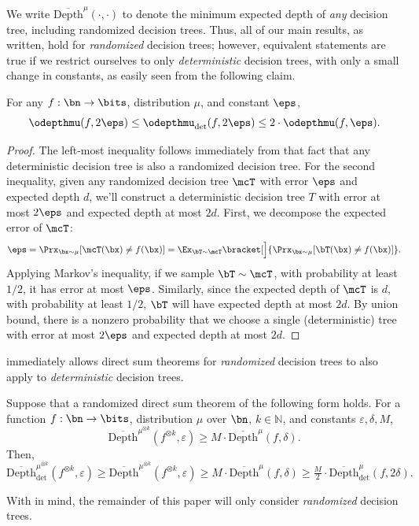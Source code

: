 We write $\overline{\mathrm{Depth}}^{\mu}(\cdot,\cdot)$ to denote the minimum expected depth of \emph{any} decision tree, including randomized decision trees. Thus, all of our main results, as written, hold for \emph{randomized} decision trees; however, equivalent statements are true if we restrict ourselves to only \emph{deterministic} decision trees, with only a small change in constants, as easily seen from the following claim.
\begin{claim}
    \label{claim:connect-det-rand}
    For any $f:\bn \to \bits$, distribution $\mu$, and constant $\eps$,
    \begin{equation*}
         \odepthmu(f,2\eps) \leq \odepthmu_{\det}(f, 2\eps) \leq 2 \cdot \odepthmu(f, \eps).
    \end{equation*}
\end{claim}
\begin{proof}
    The left-most inequality follows immediately from that fact that any deterministic decision tree is also a randomized decision tree. For the second inequality, given any randomized decision tree $\mcT$ with error $\eps$ and expected depth $d$, we'll construct a deterministic decision tree $T$ with error at most $2\eps$ and expected depth at most $2d$. First, we decompose the expected error of $\mcT$:
    \begin{equation*}
        \eps = \Prx_{\bx \sim \mu}[\mcT(\bx) \neq f(\bx)] = \Ex_{\bT \sim \mcT}\bracket[\Big]{\Prx_{\bx \sim \mu}[\bT(\bx) \neq f(\bx)]}.
    \end{equation*}
    Applying Markov's inequality, if we sample $\bT \sim \mcT$, with probability at least $1/2$, it has error at most $\eps$. Similarly, since the expected depth of $\mcT$ is $d$, with probability at least $1/2$, $\bT$ will have expected depth at most $2d$. By union bound, there is a nonzero probability that we choose a single (deterministic) tree with error at most $2\eps$ and expected depth at most $2d$.
\end{proof}
 immediately allows direct sum theorems for \emph{randomized} decision trees to also apply to \emph{deterministic} decision trees.
\begin{corollary}
    \label{cor:rand-to-det-DP}
    Suppose that a randomized direct sum theorem of the following form holds. For a function $f: \bn \to \bits$, distribution $\mu$  over $\bn$,  $k\in \mathbb{N}$, and constants $\varepsilon, \delta, M$,
    \[ \overline{\mathrm{Depth}}^{\mu^{\otimes k}}(f^{\otimes k},\varepsilon) \ge M \cdot \overline{\mathrm{Depth}}^{\mu}(f,\delta).\]
    Then, 
     \[ \overline{\mathrm{Depth}}_{\det}^{\mu^{\otimes k}}(f^{\otimes k},\varepsilon) \geq \overline{\mathrm{Depth}}^{\mu^{\otimes k}}(f^{\otimes k},\varepsilon) \ge M \cdot \overline{\mathrm{Depth}}^{\mu}(f,\delta) \geq  \tfrac{M}2 \cdot \overline{\mathrm{Depth}}^{\mu}_{\mathrm{det}}(f,2\delta).\]
\end{corollary}
With  in mind, the remainder of this paper will only consider \emph{randomized} decision trees.

